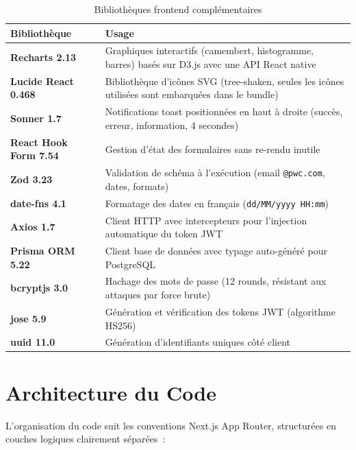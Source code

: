 \begin{table}[H]
\centering
\caption{Bibliothèques frontend complémentaires}
\label{tab:frontend-libs}
\begin{tabular}{>{\bfseries}p{4.5cm} p{9.5cm}}
\toprule
Bibliothèque & Usage \\
\midrule
Recharts 2.13 & Graphiques interactifs (camembert, histogramme, barres) basés sur D3.js avec une API React native \\
Lucide React 0.468 & Bibliothèque d'icônes SVG (tree-shaken, seules les icônes utilisées sont embarquées dans le bundle) \\
Sonner 1.7 & Notifications toast positionnées en haut à droite (succès, erreur, information, 4 secondes) \\
React Hook Form 7.54 & Gestion d'état des formulaires sans re-rendu inutile \\
Zod 3.23 & Validation de schéma à l'exécution (email \texttt{@pwc.com}, dates, formats) \\
date-fns 4.1 & Formatage des dates en français (\texttt{dd/MM/yyyy HH:mm}) \\
Axios 1.7 & Client HTTP avec intercepteurs pour l'injection automatique du token JWT \\
Prisma ORM 5.22 & Client base de données avec typage auto-généré pour PostgreSQL \\
bcryptjs 3.0 & Hachage des mots de passe (12 rounds, résistant aux attaques par force brute) \\
jose 5.9 & Génération et vérification des tokens JWT (algorithme HS256) \\
uuid 11.0 & Génération d'identifiants uniques côté client \\
\bottomrule
\end{tabular}
\end{table}

\section{Architecture du Code}

L'organisation du code suit les conventions Next.js App Router, structurées en couches logiques clairement séparées~:

